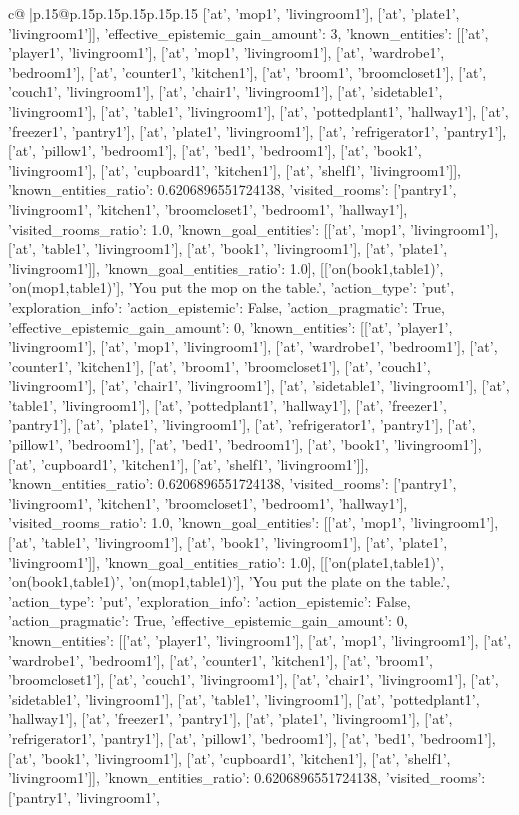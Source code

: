 \documentclass{article}
\begin{document}
{\begin{supertabular}{c@{$\;$}|p{.15\linewidth}@{}p{.15\linewidth}p{.15\linewidth}p{.15\linewidth}p{.15\linewidth}p{.15\linewidth}}
{{{['at', 'mop1', 'livingroom1'], ['at', 'plate1', 'livingroom1']], 'effective_epistemic_gain_amount': 3, 'known_entities': [['at', 'player1', 'livingroom1'], ['at', 'mop1', 'livingroom1'], ['at', 'wardrobe1', 'bedroom1'], ['at', 'counter1', 'kitchen1'], ['at', 'broom1', 'broomcloset1'], ['at', 'couch1', 'livingroom1'], ['at', 'chair1', 'livingroom1'], ['at', 'sidetable1', 'livingroom1'], ['at', 'table1', 'livingroom1'], ['at', 'pottedplant1', 'hallway1'], ['at', 'freezer1', 'pantry1'], ['at', 'plate1', 'livingroom1'], ['at', 'refrigerator1', 'pantry1'], ['at', 'pillow1', 'bedroom1'], ['at', 'bed1', 'bedroom1'], ['at', 'book1', 'livingroom1'], ['at', 'cupboard1', 'kitchen1'], ['at', 'shelf1', 'livingroom1']], 'known_entities_ratio': 0.6206896551724138, 'visited_rooms': ['pantry1', 'livingroom1', 'kitchen1', 'broomcloset1', 'bedroom1', 'hallway1'], 'visited_rooms_ratio': 1.0, 'known_goal_entities': [['at', 'mop1', 'livingroom1'], ['at', 'table1', 'livingroom1'], ['at', 'book1', 'livingroom1'], ['at', 'plate1', 'livingroom1']], 'known_goal_entities_ratio': 1.0}}], [['on(book1,table1)', 'on(mop1,table1)'], 'You put the mop on the table.', {'action_type': 'put', 'exploration_info': {'action_epistemic': False, 'action_pragmatic': True, 'effective_epistemic_gain_amount': 0, 'known_entities': [['at', 'player1', 'livingroom1'], ['at', 'mop1', 'livingroom1'], ['at', 'wardrobe1', 'bedroom1'], ['at', 'counter1', 'kitchen1'], ['at', 'broom1', 'broomcloset1'], ['at', 'couch1', 'livingroom1'], ['at', 'chair1', 'livingroom1'], ['at', 'sidetable1', 'livingroom1'], ['at', 'table1', 'livingroom1'], ['at', 'pottedplant1', 'hallway1'], ['at', 'freezer1', 'pantry1'], ['at', 'plate1', 'livingroom1'], ['at', 'refrigerator1', 'pantry1'], ['at', 'pillow1', 'bedroom1'], ['at', 'bed1', 'bedroom1'], ['at', 'book1', 'livingroom1'], ['at', 'cupboard1', 'kitchen1'], ['at', 'shelf1', 'livingroom1']], 'known_entities_ratio': 0.6206896551724138, 'visited_rooms': ['pantry1', 'livingroom1', 'kitchen1', 'broomcloset1', 'bedroom1', 'hallway1'], 'visited_rooms_ratio': 1.0, 'known_goal_entities': [['at', 'mop1', 'livingroom1'], ['at', 'table1', 'livingroom1'], ['at', 'book1', 'livingroom1'], ['at', 'plate1', 'livingroom1']], 'known_goal_entities_ratio': 1.0}}], [['on(plate1,table1)', 'on(book1,table1)', 'on(mop1,table1)'], 'You put the plate on the table.', {'action_type': 'put', 'exploration_info': {'action_epistemic': False, 'action_pragmatic': True, 'effective_epistemic_gain_amount': 0, 'known_entities': [['at', 'player1', 'livingroom1'], ['at', 'mop1', 'livingroom1'], ['at', 'wardrobe1', 'bedroom1'], ['at', 'counter1', 'kitchen1'], ['at', 'broom1', 'broomcloset1'], ['at', 'couch1', 'livingroom1'], ['at', 'chair1', 'livingroom1'], ['at', 'sidetable1', 'livingroom1'], ['at', 'table1', 'livingroom1'], ['at', 'pottedplant1', 'hallway1'], ['at', 'freezer1', 'pantry1'], ['at', 'plate1', 'livingroom1'], ['at', 'refrigerator1', 'pantry1'], ['at', 'pillow1', 'bedroom1'], ['at', 'bed1', 'bedroom1'], ['at', 'book1', 'livingroom1'], ['at', 'cupboard1', 'kitchen1'], ['at', 'shelf1', 'livingroom1']], 'known_entities_ratio': 0.6206896551724138, 'visited_rooms': ['pantry1', 'livingroom1', }}}
\end{supertabular}}
\end{document}
